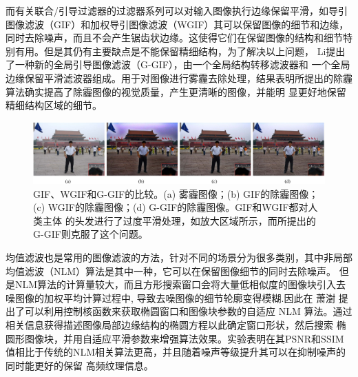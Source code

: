 而有关联合/引导过滤器的过滤器系列可以对输入图像执行边缘保留平滑，如导引图像滤波（GIF）和加权导引图像滤波（WGIF）其可以保留图像的细节和边缘，
同时去除噪声，而且不会产生锯齿状边缘。这使得它们在保留图像的结构和细节特别有用。但是其仍有主要缺点是不能保留精细结构，为了解决以上问题，
Li提出了一种新的全局引导图像滤波（G-GIF）\cite{SingleImageDeHazingUsingGloballyGuidedImageFiltering2018}，由一个全局结构转移滤波器和
一个全局边缘保留平滑滤波器组成。用于对图像进行雾霾去除处理，结果表明所提出的除霾算法确实提高了除霾图像的视觉质量，产生更清晰的图像，并能明
显更好地保留精细结构区域的细节。

\begin{figure}[htbp]
	\begin{center}
	    \vspace{10pt} %
		\includegraphics[width = 1\textwidth]{images/05.eps}
		\caption{GIF、WGIF和G-GIF的比较。(a) 雾霾图像；(b) GIF的除霾图像；(c) WGIF的除霾图像；(d) G-GIF的除霾图像。GIF和WGIF都对人类主体
        的头发进行了过度平滑处理，如放大区域所示，而所提出的G-GIF则克服了这个问题。} 
		\label{05} %
	\end{center}
\end{figure}

均值滤波也是常用的图像滤波的方法，针对不同的场景分为很多类别，其中非局部均值滤波（NLM）算法是其中一种，它可以在保留图像细节的同时去除噪声。
但是NLM算法的计算量较大，而且方形搜索窗口会将大量低相似度的图像块引入去噪图像的加权平均计算过程中, 导致去噪图像的细节轮廓变得模糊.因此在
萧澍\cite{xiaoTuoyuanchuangkouhecanshuzishiyingdefeijubujunzhisuanfa2020}
提出了可以利用控制核函数来获取椭圆窗口和图像块参数的自适应 NLM 算法。通过相关信息获得描述图像局部边缘结构的椭圆方程以此确定窗口形状，然后搜索
椭圆形图像块，并用自适应平滑参数来增强算法效果。实验表明在其PSNR和SSIM值相比于传统的NLM相关算法更高，并且随着噪声等级提升其可以在抑制噪声的同时能更好的保留
高频纹理信息。


